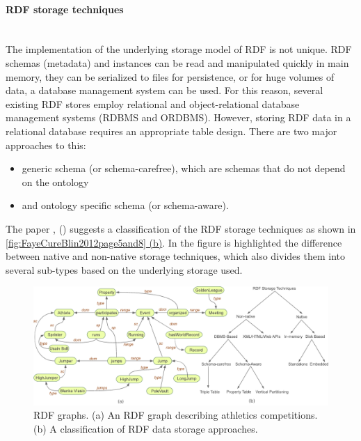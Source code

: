 \paragraph{RDF storage techniques}\mbox{}\\\indent
The implementation of the underlying storage model of RDF is not unique.
RDF schemas (metadata) and instances can be read and manipulated quickly in main memory, they can be serialized to files for persistence, or for huge volumes of data, a database management system can be used.
For this reason, several existing RDF stores employ relational and object-relational database management systems (RDBMS and ORDBMS).
However, storing RDF data in a relational database requires an appropriate table design.
There are two major approaches to this:
 \begin{itemize}[noitemsep]
	\item generic schema (or schema-carefree), which are schemas that do not depend on the ontology
	\item and ontology specific schema (or schema-aware).
\end{itemize}

The paper , \citeauthor{FayeCureBlin2012} (\citeyear{FayeCureBlin2012}) suggests a classification of the RDF storage techniques as shown in \hyperref[fig:FayeCureBlin2012page5and8]{\autoref{fig:FayeCureBlin2012page5and8} (b)}.
In the figure is highlighted the difference between native and non-native storage techniques, which also divides them into several sub-types based on the underlying storage used.

\begin{figure}[H]%
	\centering%
	\includegraphics[width=1\textwidth-4pt,%
		bgcolor=white,%
		cfbox=lightestgray %
			  2pt %
			  0pt %
			  0pt %
	]{images/chapter2/FayeCureBlin2012page5and8.pdf}%
	\caption[RDF graphs]{RDF graphs. (a) An RDF graph describing athletics competitions. (b) A classification of RDF data storage approaches.}%
	\label{fig:FayeCureBlin2012page5and8}%
\end{figure}%

